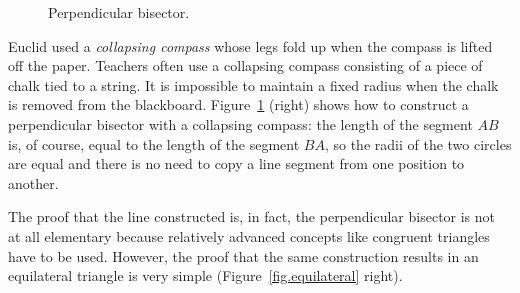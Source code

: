 \begin{figure}[H]
\begin{center}
\caption{Perpendicular bisector.}\label{fig.bisector}
\end{center}
\end{figure}
\vspace*{-3ex}
Euclid used a \emph{collapsing compass} whose legs fold up when the compass is lifted off the paper. Teachers often use a collapsing compass consisting of a piece of chalk tied to a string. It is impossible to maintain a fixed radius when the chalk is removed from the blackboard. Figure~\ref{fig.bisector} (right) shows how to construct a perpendicular bisector with a collapsing compass: the length of the segment $AB$ is, of course, equal to the length of the segment $BA$, so the radii of the two circles are equal and there is no need to copy a line segment from one position to another.

The proof that the line constructed is, in fact, the perpendicular bisector is not at all elementary because relatively advanced concepts like congruent triangles have to be used. However, the proof that the same construction results in an equilateral triangle is very simple (Figure~\ref{fig.equilateral} right).

